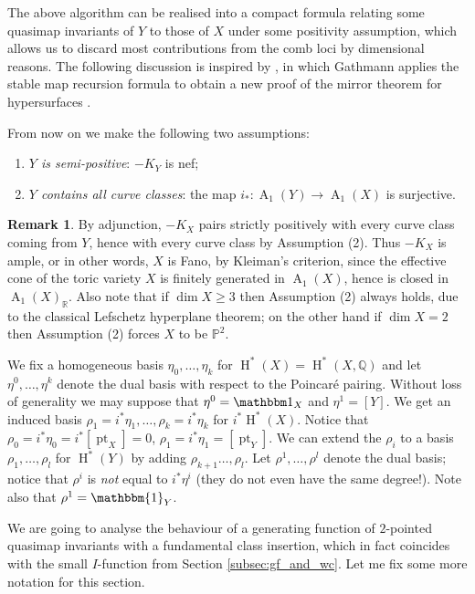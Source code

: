 \documentclass[11pt]{amsart}
\newcommand{\PP}{\mathbb P}
\newcommand{\QQ}{\mathbb{Q}}
\renewcommand{\to}{\rightarrow}
\newcommand{\HH}{\operatorname{H}}
\newcommand{\Achow}{\operatorname{A}}
\newcommand{\pt}{\operatorname{pt}}
\theoremstyle{definition}
\theoremstyle{definition}
\newtheorem{rmk}[thm]{Remark}
\begin{document}
\smallskip

The above algorithm can be realised into a compact formula relating some quasimap invariants of $Y$ to those of $X$ under some positivity assumption, which allows us to discard most contributions from the comb loci by dimensional reasons. The following discussion is inspired by \cite{Ga-MF}, in which Gathmann applies the stable map recursion formula to obtain a new proof of the mirror theorem for hypersurfaces \cite{Givental-equivariantGW}.

From now on we make the following two assumptions:
\begin{enumerate}
\item \emph{$Y$ is semi-positive}: $-K_Y$ is nef;
\item \emph{$Y$ contains all curve classes}: the map $i_* : \Achow_1(Y) \to \Achow_1(X)$ is surjective.
\end{enumerate}
\begin{rmk}
 By adjunction, $-K_X$ pairs strictly positively with every curve class coming from $Y$, hence with every curve class by Assumption (2). Thus $-K_X$ is ample, or in other words, $X$ is Fano, by Kleiman's criterion, since the effective cone of the toric variety $X$ is finitely generated in $\Achow_1(X)$, hence is closed in $\Achow_1(X)_{\mathbb{R}}$. Also note that if $\dim X \geq 3$ then Assumption (2) always holds, due to the classical Lefschetz hyperplane theorem; on the other hand if $\dim X = 2$ then Assumption (2) forces $X$ to be $\PP^2$.
\end{rmk}

We fix a homogeneous basis $\eta_0, \ldots, \eta_k$ for $\HH^*(X) = \HH^*(X,\QQ)$ and let $\eta^0, \ldots, \eta^k$ denote the dual basis with respect to the Poincar\'e pairing. Without loss of generality we may suppose that $\eta^0=\mathbbm 1_X$ and $\eta^1=[Y]$. We get an induced basis $\rho_1=i^*\eta_1, \ldots, \rho_k = i^* \eta_k$ for $i^*\HH^*(X)$. Notice that $\rho_0 = i^* \eta_0 = i^* [\pt_X] = 0$, $\rho_1 = i^* \eta_1 = [\pt_Y]$.  We can extend the $\rho_i$ to a basis $\rho_1, \ldots, \rho_l$ for $\HH^*(Y)$ by adding $\rho_{k+1}\ldots,\rho_{l}$. Let $\rho^1, \ldots, \rho^l$ denote the dual basis; notice that $\rho^i$ is \emph{not} equal to $i^* \eta^i$ (they do not even have the same degree!).  Note also that $\rho^1 = \mathbbm{1}_Y$.

We are going to analyse the behaviour of a generating function of $2$-pointed quasimap invariants with a fundamental class insertion, which in fact coincides with the small $I$-function from Section \ref{subsec:gf_and_wc}. Let me fix some more notation for this section.
\end{document}
